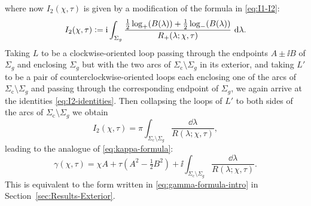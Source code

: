 where now $I_2(\chi,\tau)$ is given by a modification of the formula in \eqref{eq:I1-I2}:
\begin{equation}
I_2(\chi,\tau)\vcentcolon=\mathrm{i}\int_{\Sigma_g}\frac{\tfrac{1}{2}\log_+(B(\lambda))+\tfrac{1}{2}\log_-(B(\lambda))}{R_+(\lambda;\chi,\tau)}\,\,\mathrm{d}\lambda.
\end{equation}
Taking $L$ to be a clockwise-oriented loop passing through the endpoints $A\pm\ii B$ of $\Sigma_g$ and enclosing $\Sigma_g$ but with the two arcs of $\Sigma_\mathrm{c}\setminus\Sigma_g$ in its exterior, and taking $L'$ to be a pair of counterclockwise-oriented loops each enclosing one of the arcs of $\Sigma_\mathrm{c}\setminus\Sigma_g$ and passing through the corresponding endpoint of $\Sigma_g$, we again arrive at the identities \eqref{eq:I2-identities}.  Then collapsing the loops of $L'$ to both sides of the arcs of $\Sigma_\mathrm{c}\setminus\Sigma_g$ we obtain
\begin{equation}
I_2(\chi,\tau)=\pi\int_{\Sigma_\mathrm{c}\setminus\Sigma_g}\frac{\dd\lambda}{R(\lambda;\chi,\tau)},
\end{equation}
leading to the analogue of \eqref{eq:kappa-formula}:
\begin{equation}
\gamma(\chi,\tau)=\chi A+\tau(A^2-\tfrac{1}{2}B^2) +\ii\int_{\Sigma_\mathrm{c}\setminus\Sigma_g}\frac{\dd\lambda}{R(\lambda;\chi,\tau)}.
\label{eq:gamma-formula}
\end{equation}
This is equivalent to the form written in \eqref{eq:gamma-formula-intro} in Section~\ref{sec:Results-Exterior}.

